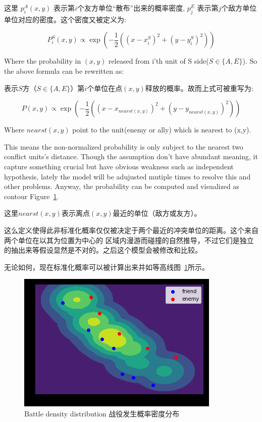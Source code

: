\documentclass{article}
\begin{document}
这里 $p^A_{i}(x,y)$ 表示第$i$个友方单位“散布”出来的概率密度,
$p^E_{j}$ 表示第$j$个敌方单位单位对应的密度。这个密度又被定义为:


$$
P^S_i(x,y) \propto \exp(-\frac{1}{2}((x-x^S_i)^2 + (y-y^S_i)^2))
$$

Where the probability in $(x,y)$ released from i'th unit of S side($S \in \{A,E \}$). 
So the above formula can be rewritten as: 

表示$S$方（$S \in \{A,E  \}$）第$i$个单位在点$(x,y)$释放的概率。故而上式可被重写为: 

$$
P(x,y) \propto \exp(-\frac{1}{2}((x-x_{nearst(x,y)})^2 + (y-y_{nearst(x,y)})^2))
$$

Where $nearst(x,y)$ point to the unit(enemy or ally) which is nearest to (x,y).

This means the non-normalized probability is only subject to the nearest two conflict units’s distance. 
Though the assumption don’t have abundant meaning,
it capture something crucial but have obvious weakness such as independent hypothesis, 
lately the model will be adujusted mutiple times to resolve this and other problems. 
Anyway, the probability can be computed and visualized as contour Figure~\ref{fig:stateNoBattleProb}.

这里$nearst(x,y)$表示离点$(x,y)$最近的单位（敌方或友方）。

这么定义使得此非标准化概率仅仅被决定于两个最近的冲突单位的距离。这个来自两个单位在以其为位置为中心的
区域内漫游而碰撞的自然推导，不过它们是独立的抽出来等假设显然是不对的。之后这个模型会被修改和比较。

无论如何，现在标准化概率可以被计算出来并如等高线图~\ref{fig:stateNoBattleProb}所示。

\begin{figure}[ht]
\includegraphics{state_no_battle_prob.png}
\caption{Battle density distribution 战役发生概率密度分布}
\label{fig:stateNoBattleProb}
\end{figure}
\end{document}

